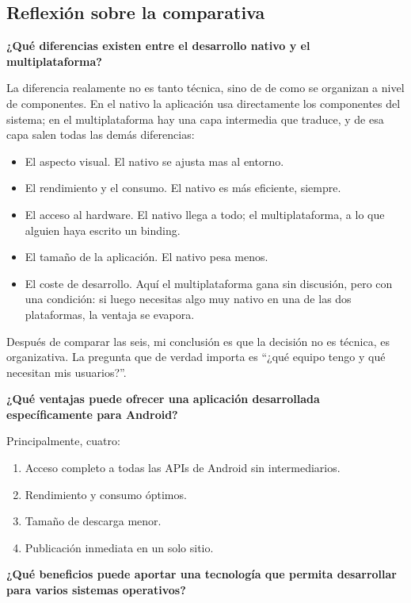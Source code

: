 \documentclass[11pt,a4paper]{article}
\newcommand{\campo}[1]{\textbf{\color{navy}#1}}
\begin{document}
	\subsection{Reflexión sobre la comparativa}
	
	\campo{¿Qué diferencias existen entre el desarrollo nativo y el multiplataforma?}
	
	La diferencia realamente no es tanto técnica, sino de de como se organizan a nivel de componentes. En el nativo la aplicación usa directamente los componentes del sistema; en el multiplataforma hay una capa intermedia que traduce, y de esa capa salen todas las demás diferencias:
	\begin{itemize}[leftmargin=*,itemsep=0.2em,topsep=0.2em]
		\item El aspecto visual. El nativo se ajusta mas al entorno.
		\item El rendimiento y el consumo. El nativo es más eficiente, siempre.
		\item El acceso al hardware. El nativo llega a todo; el multiplataforma, a lo que alguien haya escrito un binding.
		\item El tamaño de la aplicación. El nativo pesa menos.
		\item El coste de desarrollo. Aquí el multiplataforma gana sin discusión, pero con una condición: si luego necesitas algo muy nativo en una de las dos plataformas, la ventaja se evapora.
	\end{itemize}
	
	Después de comparar las seis, mi conclusión es que la decisión no es técnica, es organizativa. La pregunta que de verdad importa es \enquote{¿qué equipo tengo y qué necesitan mis usuarios?}.
	
	\campo{¿Qué ventajas puede ofrecer una aplicación desarrollada específicamente para Android?}
	
	Principalmente, cuatro:
	\begin{enumerate}[leftmargin=*,itemsep=0.1em]
		\item Acceso completo a todas las APIs de Android sin intermediarios.
		\item Rendimiento y consumo óptimos.
		\item Tamaño de descarga menor.
		\item Publicación inmediata en un solo sitio.
	\end{enumerate}
	
	\campo{¿Qué beneficios puede aportar una tecnología que permita desarrollar para varios sistemas operativos?}
	
\end{document}
